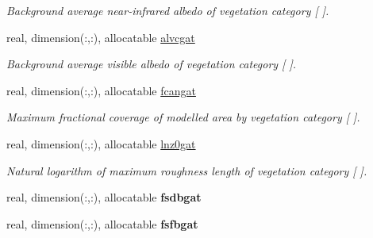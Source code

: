 \begin{DoxyCompactItemize}
\begin{DoxyCompactList}\small\item\em Background average near-\/infrared albedo of vegetation category \mbox{[} \mbox{]}. \end{DoxyCompactList}\item 
\hypertarget{structclass__statevars_1_1class__gather_aa9fed752453e3c78867551faa109dd7e}{}real, dimension(\+:,\+:), allocatable \hyperlink{structclass__statevars_1_1class__gather_aa9fed752453e3c78867551faa109dd7e}{alvcgat}\label{structclass__statevars_1_1class__gather_aa9fed752453e3c78867551faa109dd7e}

\begin{DoxyCompactList}\small\item\em Background average visible albedo of vegetation category \mbox{[} \mbox{]}. \end{DoxyCompactList}\item 
\hypertarget{structclass__statevars_1_1class__gather_a35f379c695df65f5c3a2a526fa1c714f}{}real, dimension(\+:,\+:), allocatable \hyperlink{structclass__statevars_1_1class__gather_a35f379c695df65f5c3a2a526fa1c714f}{fcangat}\label{structclass__statevars_1_1class__gather_a35f379c695df65f5c3a2a526fa1c714f}

\begin{DoxyCompactList}\small\item\em Maximum fractional coverage of modelled area by vegetation category \mbox{[} \mbox{]}. \end{DoxyCompactList}\item 
\hypertarget{structclass__statevars_1_1class__gather_afe1b493d02667082659d23bea633cfec}{}real, dimension(\+:,\+:), allocatable \hyperlink{structclass__statevars_1_1class__gather_afe1b493d02667082659d23bea633cfec}{lnz0gat}\label{structclass__statevars_1_1class__gather_afe1b493d02667082659d23bea633cfec}

\begin{DoxyCompactList}\small\item\em Natural logarithm of maximum roughness length of vegetation category \mbox{[} \mbox{]}. \end{DoxyCompactList}\item 
\hypertarget{structclass__statevars_1_1class__gather_a27b98f2306246333ae527aeeee58f9ff}{}real, dimension(\+:,\+:), allocatable {\bfseries fsdbgat}\label{structclass__statevars_1_1class__gather_a27b98f2306246333ae527aeeee58f9ff}

\item 
\hypertarget{structclass__statevars_1_1class__gather_ad9de7f9fb3978e0ce5cd714ec86a8b3a}{}real, dimension(\+:,\+:), allocatable {\bfseries fsfbgat}\label{structclass__statevars_1_1class__gather_ad9de7f9fb3978e0ce5cd714ec86a8b3a}


\end{DoxyCompactItemize}
